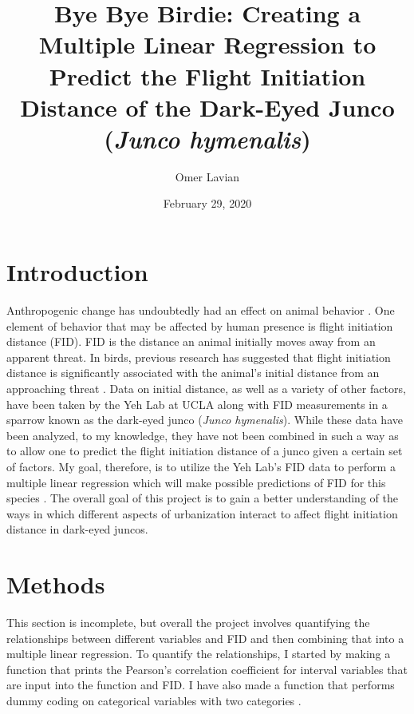 \documentclass{article}
\title{Bye Bye Birdie: Creating a Multiple Linear Regression to Predict the Flight Initiation Distance of the Dark-Eyed Junco (\textit{Junco hymenalis})}
\author{Omer Lavian}
\date{February 29, 2020}
\begin{document}
\maketitle
\newpage
\tableofcontents

\newpage
\section{Introduction}
\hspace{1 cm} Anthropogenic change has undoubtedly had an effect on animal behavior \cite{wong_behavioral_2015}. One element of behavior that may be affected by human presence is flight initiation distance (FID). FID is the distance an animal initially moves away from an apparent threat. In birds, previous research has suggested that flight initiation distance is significantly associated with the animal's initial distance from an approaching threat \cite{blumstein_flight-initiation_2003}. Data on initial distance, as well as a variety of other factors, have been taken by the Yeh Lab at UCLA along with FID measurements in a sparrow known as the dark-eyed junco (\textit{Junco hymenalis}). While these data have been analyzed, to my knowledge, they have not been combined in such a way as to allow one to predict the flight initiation distance of a junco given a certain set of factors. My goal, therefore, is to utilize the Yeh Lab's FID data to perform a multiple linear regression which will make possible predictions of FID for this species \cite{noauthor_multiple_nodate}. The overall goal of this project is to gain a better understanding of the ways in which different aspects of urbanization interact to affect flight initiation distance in dark-eyed juncos. 
  

\section{Methods}
\hspace{1 cm} This section is incomplete, but overall the project involves quantifying the relationships between different variables and FID and then combining that into a multiple linear regression. To quantify the relationships, I started by making a function that prints the Pearson's correlation coefficient for interval variables that are input into the function and FID. I have also made a function that performs dummy coding on categorical variables with two categories \cite{noauthor_dummy_nodate}.





\end{document}
